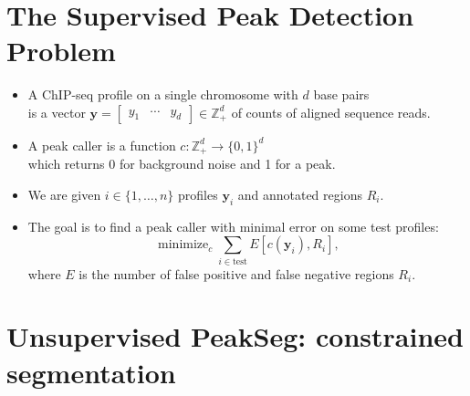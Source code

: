 \documentclass[legalpaper]{article}
\newcommand{\ZZ}{\mathbb Z}
\DeclareMathOperator*{\minimize}{minimize}
\begin{document}
\section*{The Supervised Peak Detection Problem}

\begin{itemize}
\item A ChIP-seq profile on a single
chromosome with $d$ base pairs\\ is a vector $\mathbf y=
\left[
  \begin{array}{ccc}
    y_1 & \cdots & y_d
  \end{array}
\right]\in\ZZ_+^d$ of counts of aligned sequence reads. 
\item A peak caller is a function $c:\ZZ_+^d
  \rightarrow \{0, 1\}^d$\\
  which returns 0 for background noise and 1 for a peak.
\item We are given $i\in\{1,\dots, n\}$ profiles 
  $\mathbf y_i$ and annotated regions $R_i$.
\item The goal is to find a peak caller with minimal error on some
test profiles:
\begin{equation*}
  \label{eq:min_error}
  \minimize_c \sum_{i\in\text{test}} E[c(\mathbf y_i),  R_i],
\end{equation*}
where $E$ is the number of false positive and false negative regions $R_i$.
\end{itemize}

\newpage 

\section*{Unsupervised PeakSeg: 
constrained segmentation}
\end{document}
